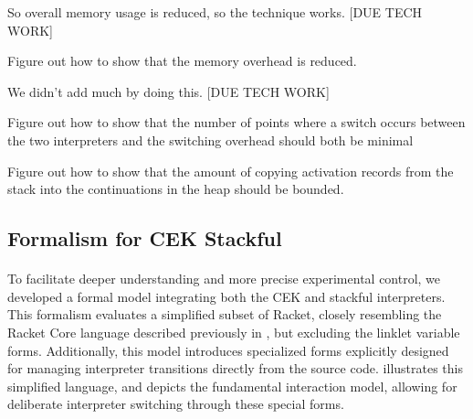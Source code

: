       \begin{paragraph-here}
        So overall memory usage is reduced, so the technique works. [DUE TECH WORK]
      \end{paragraph-here}

      \begin{todo}
        Figure out how to show that the memory overhead is reduced.
      \end{todo}

      \begin{paragraph-here}
        We didn't add much by doing this. [DUE TECH WORK]
      \end{paragraph-here}

      \begin{todo}
        Figure out how to show that the number of points where a switch occurs between the two interpreters and the switching overhead should both be minimal
      \end{todo}

      \begin{todo}
        Figure out how to show that the amount of copying activation records from the stack into the continuations in the heap should be bounded.
      \end{todo}

    \subsection{Formalism for CEK \+ Stackful}


      \paragraph{}%
        To facilitate deeper understanding and more precise experimental control, we developed a formal model integrating both the CEK and stackful interpreters. This formalism evaluates a simplified subset of Racket, closely resembling the Racket Core language described previously in , but excluding the linklet variable forms. Additionally, this model introduces specialized  forms explicitly designed for managing interpreter transitions directly from the source code.  illustrates this simplified language, and  depicts the fundamental interaction model, allowing for deliberate interpreter switching through these special forms.

